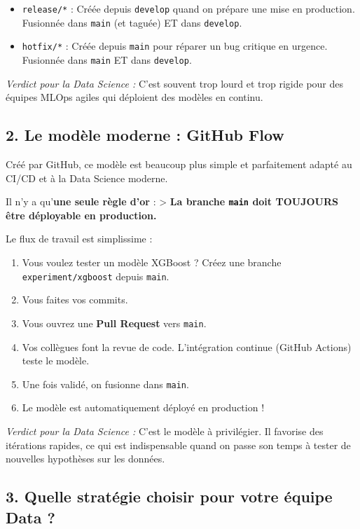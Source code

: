 \documentclass[
  letterpaper,
  DIV=11,
  numbers=noendperiod]{scrreprt}
\begin{document}
\begin{itemize}
\item
  \texttt{release/*} : Créée depuis \texttt{develop} quand on prépare
  une mise en production. Fusionnée dans \texttt{main} (et taguée) ET
  dans \texttt{develop}.
\item
  \texttt{hotfix/*} : Créée depuis \texttt{main} pour réparer un bug
  critique en urgence. Fusionnée dans \texttt{main} ET dans
  \texttt{develop}.
\end{itemize}

\emph{Verdict pour la Data Science :} C'est souvent trop lourd et trop
rigide pour des équipes MLOps agiles qui déploient des modèles en
continu.

\subsection{2. Le modèle moderne : GitHub
Flow}\label{le-moduxe8le-moderne-github-flow}

Créé par GitHub, ce modèle est beaucoup plus simple et parfaitement
adapté au CI/CD et à la Data Science moderne.

Il n'y a qu'\textbf{une seule règle d'or} : \textgreater{} \textbf{La
branche \texttt{main} doit TOUJOURS être déployable en production.}

Le flux de travail est simplissime :

\begin{enumerate}
\def\labelenumi{\arabic{enumi}.}
\item
  Vous voulez tester un modèle XGBoost ? Créez une branche
  \texttt{experiment/xgboost} depuis \texttt{main}.
\item
  Vous faites vos commits.
\item
  Vous ouvrez une \textbf{Pull Request} vers \texttt{main}.
\item
  Vos collègues font la revue de code. L'intégration continue (GitHub
  Actions) teste le modèle.
\item
  Une fois validé, on fusionne dans \texttt{main}.
\item
  Le modèle est automatiquement déployé en production !
\end{enumerate}

\emph{Verdict pour la Data Science :} C'est le modèle à privilégier. Il
favorise des itérations rapides, ce qui est indispensable quand on passe
son temps à tester de nouvelles hypothèses sur les données.

\subsection{3. Quelle stratégie choisir pour votre équipe Data
?}\label{quelle-stratuxe9gie-choisir-pour-votre-uxe9quipe-data}
\end{document}
